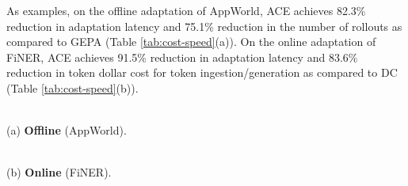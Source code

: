 As examples, on the offline adaptation of AppWorld, ACE achieves 82.3\% reduction in adaptation latency and 75.1\% reduction in the number of rollouts as compared to GEPA (Table \ref{tab:cost-speed}(a)). 
On the online adaptation of FiNER, ACE achieves 91.5\% reduction in adaptation latency and 83.6\% reduction in token dollar cost for token ingestion/generation as compared to DC (Table \ref{tab:cost-speed}(b)).

\begin{table}[!tbhp]
  \centering
  \begin{minipage}[t]{0.45\linewidth}
    \centering
    \vspace{2pt}\\
    (a) \textbf{Offline} (AppWorld).
  \end{minipage}
  \hfill
  \begin{minipage}[t]{0.43\linewidth}
    \centering
    \vspace{2pt}\\
    (b) \textbf{Online} (FiNER).
  \end{minipage}

  \vspace{3pt}
  \caption{\textbf{Cost and Speed Analysis.} We measure the context adaptation latency, number of rollouts, and dollar costs of \name against GEPA (offline) and DC (online).}
  \label{tab:cost-speed}
  \vspace{-10pt}
\end{table}

